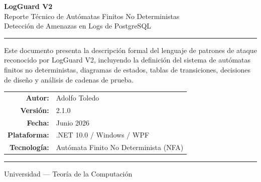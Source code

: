\documentclass[12pt, a4paper]{report}
\theoremstyle{definition}
\theoremstyle{remark}
\begin{document}

\begin{titlepage}
  \centering

  \vspace*{1.5cm}

  {\Huge\bfseries\color{accent} LogGuard V2}\\[0.4cm]
  {\Large Reporte Técnico de Autómatas Finitos No Deterministas}\\[0.3cm]
  {\large Detección de Amenazas en Logs de PostgreSQL}

  \vspace{1cm}
  \rule{12cm}{0.8pt}
  \vspace{1cm}

  \begin{minipage}{0.85\textwidth}
    \centering
    {\normalsize
    Este documento presenta la descripción formal del lenguaje de patrones de
    ataque reconocido por LogGuard V2, incluyendo la definición del sistema
    de autómatas finitos no deterministas, diagramas de estados, tablas de
    transiciones, decisiones de diseño y análisis de cadenas de prueba.
    }
  \end{minipage}

  \vspace{2.5cm}

  \begin{tabular}{rl}
    \textbf{Autor:}    & Adolfo Toledo \\[0.3cm]
    \textbf{Versión:}  & 2.1.0 \\[0.3cm]
    \textbf{Fecha:}    & Junio 2026 \\[0.3cm]
    \textbf{Plataforma:} & .NET 10.0 / Windows / WPF \\[0.3cm]
    \textbf{Tecnología:} & Autómata Finito No Determinista (NFA) \\
  \end{tabular}

  \vspace{3cm}
  \rule{12cm}{0.4pt}
  \vspace{0.5cm}

  {\small Universidad --- Teoría de la Computación}

  \vfill
\end{titlepage}

\tableofcontents
\clearpage
{}
\end{document}
